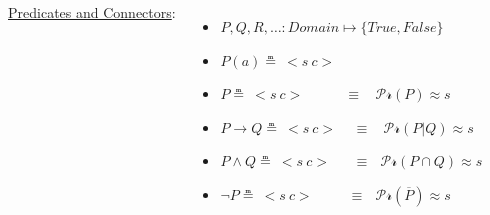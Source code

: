 \documentclass[aspectratio=169]{beamer}
\newcommand{\TTrue}{\textit{True}}
\newcommand{\TFalse}{\textit{False}}
\newcommand{\prob}[1]{\mathcal{Pr}\left(#1\right)}
\begin{document}
\begin{frame}


  \begin{columns}
    \column{7.8cm}

    \underline{Predicates and Connectors}:
    \begin{itemize}
    \item<+-> $P, Q, R, \hdots: \textit{Domain} \mapsto \{\TTrue, \TFalse\}$
    \item<+-> $P(a) \measeq\ <\!s\ c\!>$
    \item<+-> $P \measeq\ <\!s\ c\!> \ \ \ \ \ \ \ \ \ \ \ \ \ \equiv \ \ \ \ \prob{P} \approx s$
    \item<+-> $P \rightarrow Q \measeq\ <\!s\ c\!> \ \ \ \ \ \equiv \ \ \
      \ \prob{P|Q} \approx s$
    \item<+-> $P \land Q \measeq\ <\!s\ c\!> \ \ \ \ \ \ \ \! \equiv \ \ \ \prob{P
        \cap Q} \approx s$
    \item<+-> $\lnot P \measeq\ <\!s\ c\!> \ \ \ \ \ \ \ \ \ \ \! \ \equiv \ \ \
      \prob{\overline{P}} \approx s$
    \end{itemize}


\end{columns}
\end{frame}
\end{document}
